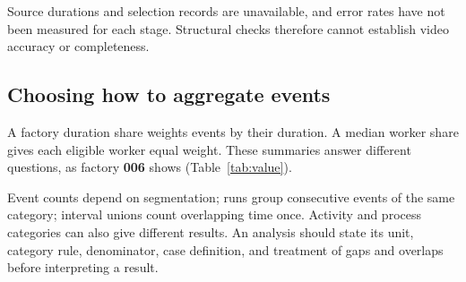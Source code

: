 Source durations and selection records are unavailable, and error rates have not been measured for each stage. Structural checks therefore cannot establish video accuracy or completeness.

\subsection{Choosing how to aggregate events}
A factory duration share weights events by their duration. A median worker share gives each eligible worker equal weight. These summaries answer different questions, as factory \textbf{006} shows (Table~\ref{tab:value}).

Event counts depend on segmentation; runs group consecutive events of the same category; interval unions count overlapping time once. Activity and process categories can also give different results. An analysis should state its unit, category rule, denominator, case definition, and treatment of gaps and overlaps before interpreting a result.
